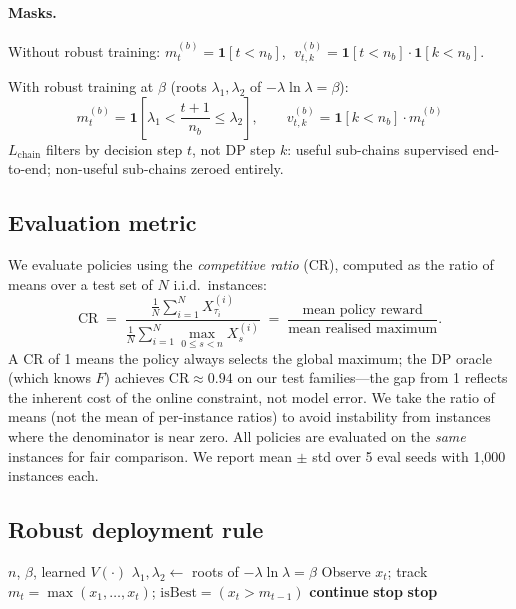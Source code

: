 \paragraph{Masks.} Without robust training: $m_t^{(b)} = \mathbf{1}[t < n_b]$, $\;v_{t,k}^{(b)} = \mathbf{1}[t < n_b]\cdot\mathbf{1}[k < n_b]$.

With robust training at $\beta$ (roots $\lambda_1, \lambda_2$ of $-\lambda\ln\lambda = \beta$):
\[
m_t^{(b)} = \mathbf{1}\!\left[\lambda_1 < \frac{t{+}1}{n_b} \le \lambda_2\right], \qquad v_{t,k}^{(b)} = \mathbf{1}[k < n_b] \cdot m_t^{(b)}
\]
$L_{\mathrm{chain}}$ filters by decision step $t$, not DP step $k$: useful sub-chains supervised end-to-end; non-useful sub-chains zeroed entirely.

\subsection{Evaluation metric}

We evaluate policies using the \emph{competitive ratio} (CR), computed as the ratio of means over a test set of $N$ i.i.d.\ instances:
\[
  \mathrm{CR} \;=\; \frac{\frac{1}{N}\sum_{i=1}^{N} X^{(i)}_{\tau_i}}{\frac{1}{N}\sum_{i=1}^{N} \max_{0 \le s < n} X^{(i)}_s}
  \;=\; \frac{\text{mean policy reward}}{\text{mean realised maximum}}.
\]
A CR of 1 means the policy always selects the global maximum; the DP oracle (which knows $F$) achieves $\mathrm{CR} \approx 0.94$ on our test families---the gap from 1 reflects the inherent cost of the online constraint, not model error. We take the ratio of means (not the mean of per-instance ratios) to avoid instability from instances where the denominator is near zero. All policies are evaluated on the \emph{same} instances for fair comparison. We report mean $\pm$ std over 5 eval seeds with 1{,}000 instances each.

\subsection{Robust deployment rule}

\begin{algorithm}[h]
\caption{Robust stopping rule}
\label{alg:robust}
\begin{algorithmic}[1]
\Require $n$, $\beta$, learned $V(\cdot)$
\State $\lambda_1, \lambda_2 \gets$ roots of $-\lambda \ln \lambda = \beta$
    \State Observe $x_t$; track $m_t = \max(x_1, \ldots, x_t)$; $\mathrm{isBest} = (x_t > m_{t-1})$
     \textbf{continue} 
         \textbf{stop} 
        \EndIf
    \Else
         \textbf{stop} 
        \EndIf
    \EndIf
\EndFor
\end{algorithmic}
\end{algorithm}

